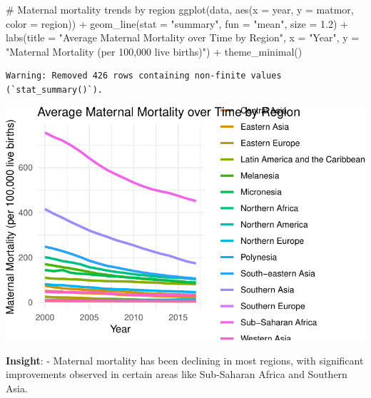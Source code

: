 \documentclass[
  letterpaper,
  DIV=11,
  numbers=noendperiod]{scrartcl}
\newenvironment{Shaded}{\begin{snugshade}}{\end{snugshade}}
\newcommand{\AttributeTok}[1]{\textcolor[rgb]{0.40,0.45,0.13}{#1}}
\newcommand{\CommentTok}[1]{\textcolor[rgb]{0.37,0.37,0.37}{#1}}
\newcommand{\FloatTok}[1]{\textcolor[rgb]{0.68,0.00,0.00}{#1}}
\newcommand{\FunctionTok}[1]{\textcolor[rgb]{0.28,0.35,0.67}{#1}}
\newcommand{\NormalTok}[1]{\textcolor[rgb]{0.00,0.23,0.31}{#1}}
\newcommand{\SpecialCharTok}[1]{\textcolor[rgb]{0.37,0.37,0.37}{#1}}
\newcommand{\StringTok}[1]{\textcolor[rgb]{0.13,0.47,0.30}{#1}}
\begin{document}
\begin{Shaded}
\begin{Highlighting}[]
\CommentTok{\# Maternal mortality trends by region}
\FunctionTok{ggplot}\NormalTok{(data, }\FunctionTok{aes}\NormalTok{(}\AttributeTok{x =}\NormalTok{ year, }\AttributeTok{y =}\NormalTok{ matmor, }\AttributeTok{color =}\NormalTok{ region)) }\SpecialCharTok{+}
  \FunctionTok{geom\_line}\NormalTok{(}\AttributeTok{stat =} \StringTok{"summary"}\NormalTok{, }\AttributeTok{fun =} \StringTok{"mean"}\NormalTok{, }\AttributeTok{size =} \FloatTok{1.2}\NormalTok{) }\SpecialCharTok{+}
  \FunctionTok{labs}\NormalTok{(}\AttributeTok{title =} \StringTok{"Average Maternal Mortality over Time by Region"}\NormalTok{, }\AttributeTok{x =} \StringTok{"Year"}\NormalTok{, }\AttributeTok{y =} \StringTok{"Maternal Mortality (per 100,000 live births)"}\NormalTok{) }\SpecialCharTok{+}
  \FunctionTok{theme\_minimal}\NormalTok{()}
\end{Highlighting}
\end{Shaded}

\begin{verbatim}
Warning: Removed 426 rows containing non-finite values (`stat_summary()`).
\end{verbatim}

\includegraphics{EDA_files/figure-pdf/unnamed-chunk-10-1.pdf}

\textbf{Insight}: - Maternal mortality has been declining in most
regions, with significant improvements observed in certain areas like
Sub-Saharan Africa and Southern Asia.
\end{document}
